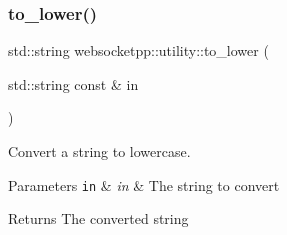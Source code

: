 \subsubsection{\texorpdfstring{to\+\_\+lower()}{to\_lower()}}
{\footnotesize\ttfamily std\+::string websocketpp\+::utility\+::to\+\_\+lower (\begin{DoxyParamCaption}\item[{std\+::string const \&}]{in }\end{DoxyParamCaption})\hspace{0.3cm}{\ttfamily [inline]}}



Convert a string to lowercase. 


\begin{DoxyParams}[1]{Parameters}
\mbox{\tt in}  & {\em in} & The string to convert \\
\hline
\end{DoxyParams}
\begin{DoxyReturn}{Returns}
The converted string 
\end{DoxyReturn}
